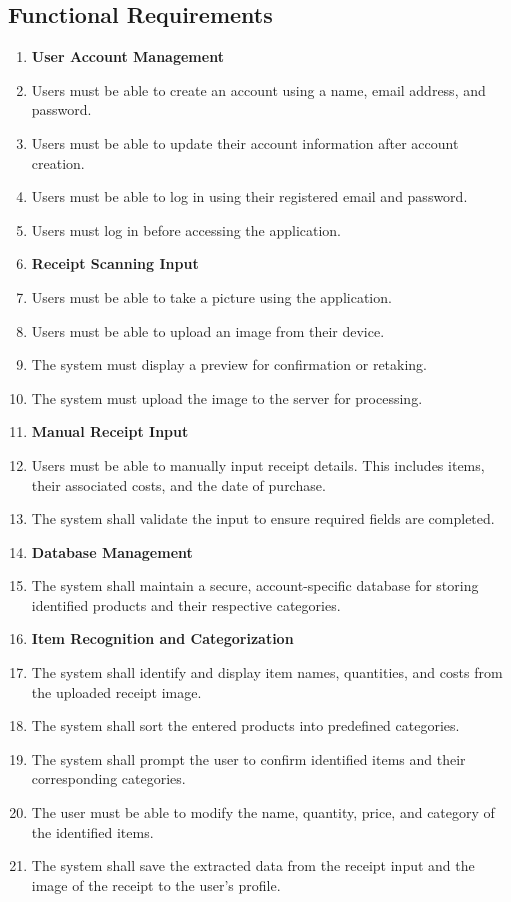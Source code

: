 \documentclass[12pt]{article}
\begin{document}
\subsection{Functional Requirements}
\begin{enumerate}[label=FR\arabic*]
  \item[] \textbf{User Account Management}
  \item Users must be able to create an account using a name, email address, and
  password.
  \item Users must be able to update their account information after account
  creation.
  \item Users must be able to log in using their registered email and password.
  \item Users must log in before accessing the application.

  \item[] \textbf{Receipt Scanning Input}
  \item Users must be able to take a picture using the application.
  \item Users must be able to upload an image from their device.
  \item The system must display a preview for confirmation or retaking.
  \item The system must upload the image to the server for processing.
  
  \item[] \textbf{Manual Receipt Input}
  \item Users must be able to manually input receipt details. This includes
  items, their associated costs, and the date of purchase.
  \item The system shall validate the input to ensure required fields are
  completed.
  
  \item[] \textbf{Database Management}
  \item The system shall maintain a secure, account-specific database for
  storing identified products and their respective categories.

  \item[] \textbf{Item Recognition and Categorization}
  \item The system shall identify and display item names, quantities, and costs
  from the uploaded receipt image.
  \item The system shall sort the entered products into predefined categories.
  \item The system shall prompt the user to confirm identified items and their
  corresponding categories.
  \item The user must be able to modify the name, quantity, price, and category
  of the identified items.
  \item The system shall save the extracted data from the receipt input and the
  image of the receipt to the user’s profile.    


\end{enumerate}
\end{document}
